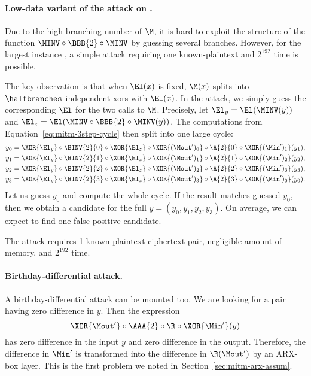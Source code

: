\paragraph{Low-data variant of the attack on .}
Due to the high branching number of $\M$, it is hard to exploit the structure of the function $\MINV \circ \BBB{2} \circ \MINV$ by guessing several branches. However, for the largest instance , a simple attack requiring one known-plaintext and $2^{192}$ time is possible.

The key observation is that when $\El(x)$ is fixed, $\M(x)$ splits into $\halfbranches$ independent xors with $\El(x)$. In the attack, we simply guess the corresponding $\El$ for the two calls to $\M$. Precisely, let $\El_y = \El(\MINV(y))$ and $\El_z = \El(\MINV\circ\BBB{2}\circ\MINV(y))$. The computations from Equation~\ref{eq:mitm-3step-cycle} then split into one large cycle:
\begin{align*}
    &y_0 = \XOR{\El_y} \circ \BINV{2}{0} \circ \XOR{\El_z} \circ \XOR{(\Mout')_0} \circ \A{2}{0} \circ \XOR{(\Min')_1} (y_1),\\
    &y_1 = \XOR{\El_y} \circ \BINV{2}{1} \circ \XOR{\El_z} \circ \XOR{(\Mout')_1} \circ \A{2}{1} \circ \XOR{(\Min')_2} (y_2),\\
    &y_2 = \XOR{\El_y} \circ \BINV{2}{2} \circ \XOR{\El_z} \circ \XOR{(\Mout')_2} \circ \A{2}{2} \circ \XOR{(\Min')_3} (y_3),\\
    &y_3 = \XOR{\El_y} \circ \BINV{2}{3} \circ \XOR{\El_z} \circ \XOR{(\Mout')_3} \circ \A{2}{3} \circ \XOR{(\Min')_0} (y_0).
\end{align*}
Let us guess $y_0$ and compute the whole cycle. If the result matches guessed $y_0$, then we obtain a candidate for the full $y = (y_0, y_1, y_2, y_3)$. On average, we can expect to find one false-positive candidate.

The attack requires 1 known plaintext-ciphertext pair, negligible amount of memory, and $2^{192}$ time. 


\paragraph{Birthday-differential attack.}
A birthday-differential attack can be mounted too. We are looking for a pair having zero difference in $y$. Then the expression
\begin{equation}
\XOR{\Mout'} \circ
\AAA{2} \circ
\R \circ
\XOR{\Min'} (y)
\end{equation}
has zero difference in the input $y$ and zero difference in the output. Therefore, the difference in $\Min'$ is transformed into the difference in $\R(\Mout')$ by an ARX-box layer. This is the first problem we noted in~Section~\ref{sec:mitm-arx-assum}.

